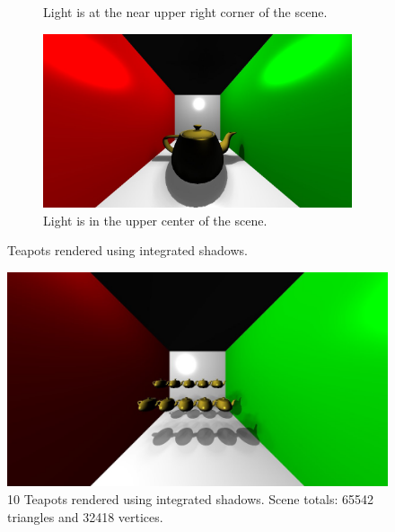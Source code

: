 \begin{figure}
\begin{subfigure}[b]{0.5\textwidth}
                \caption{Light is at the near upper right corner of the scene.}
        \end{subfigure}
        \begin{subfigure}[b]{0.5\textwidth}
                \includegraphics[width=\textwidth]{AltResults/teapotC.jpg}
                \caption{Light is in the upper center of the scene.}
        \end{subfigure}
        \caption{Teapots rendered using integrated shadows.}
\end{figure}


\begin{figure}[h!]
  \centering
    \includegraphics[width=1.0\textwidth]{AltResults/10teapots.jpg}
  \caption{10 Teapots rendered using integrated shadows. Scene totals: 65542 triangles and 32418 vertices.}
	\label{fig:teapots}
\end{figure}

